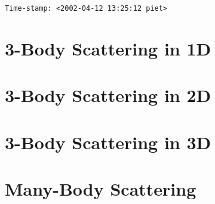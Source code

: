 \documentclass{book}
\begin{document}
  \frontmatter
\makebox[3.5in][s]{}\verb=Time-stamp: <2002-04-12 13:25:12 piet>=
%
%
%
%
%
%
    
  \mainmatter
      
    \part{3-Body Scattering in 1D}
      
      
      
    \part{3-Body Scattering in 2D}
      
      
    \part{3-Body Scattering in 3D}
      
      
      
    \part{Many-Body Scattering}
      
      
      
%      
%      
  \backmatter
\end{document}
